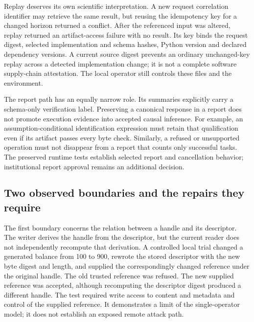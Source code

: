 Replay deserves its own scientific interpretation. A new request
correlation identifier may retrieve the same result, but reusing the
idempotency key for a changed horizon returned a conflict. After the
referenced input was altered, replay returned an artifact-access failure
with no result. Its key binds the request digest, selected
implementation and schema hashes, Python version and declared dependency
versions. A current source digest prevents an ordinary unchanged-key
replay across a detected implementation change; it is not a complete
software supply-chain attestation. The local operator still controls
these files and the environment.
\citep{exec14_custody_implementation,exec14_custody_observations}

The report path has an equally narrow role. Its summaries explicitly
carry a schema-only verification label. Preserving a canonical response
in a report does not promote execution evidence into accepted causal
inference. For example, an assumption-conditional identification
expression must retain that qualification even if its artifact passes
every byte check. Similarly, a refused or unsupported operation must not
disappear from a report that counts only successful tasks. The preserved
runtime tests establish selected report and cancellation behavior;
institutional report approval remains an additional
decision.\citep{exec14_custody_implementation,exec14_custody_observations}

\hypertarget{two-observed-boundaries-and-the-repairs-they-require}{%
\subsection{Two observed boundaries and the repairs they
require}\label{two-observed-boundaries-and-the-repairs-they-require}}

The first boundary concerns the relation between a handle and its
descriptor. The writer derives the handle from the descriptor, but the
current reader does not independently recompute that derivation. A
controlled local trial changed a generated balance from 100 to 900,
rewrote the stored descriptor with the new byte digest and length, and
supplied the correspondingly changed reference under the original
handle. The old trusted reference was refused. The new supplied
reference was accepted, although recomputing the descriptor digest
produced a different handle. The test required write access to content
and metadata and control of the supplied reference. It demonstrates a
limit of the single-operator model; it does not establish an exposed
remote attack path.\citep{exec14_custody_observations}

